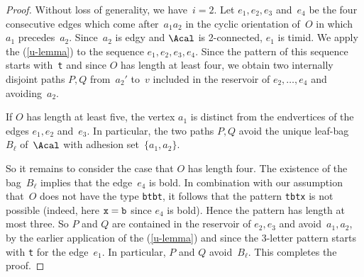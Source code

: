 \documentclass{aic}
\theoremstyle{plain}
\theoremstyle{definition}
\theoremstyle{plain}
\theoremstyle{plain}
\newcommand{\ty}[1]{{\tt#1}}
\begin{document}
\begin{proof}
Without loss of generality, we have~$i=2$.
Let $e_1,e_2,e_3$ and~$e_4$ be the four consecutive edges which come after~$a_1a_2$ in the 
cyclic orientation of~$O$ in which~$a_1$ precedes~$a_2$. 
Since~$a_2$ is edgy and $\Acal$ is 2-connected, $e_1$ is timid.
We apply the  (\ref{u-lemma}) to the sequence $e_1, e_2, e_3, e_4$. Since the pattern of this sequence starts with~\ty{t} and since $O$ has length at least four, we obtain two internally 
disjoint paths $P,Q$ from~$a_2'$ to~$v$ included in the reservoir of $e_2,\ldots ,e_4$ and avoiding~$a_2$.

If $O$ has length at least five, the vertex $a_1$ is distinct from the endvertices of the edges 
$e_1,e_2$ and~$e_3$. 
In particular, the two paths $P,Q$ avoid the unique leaf-bag~$B_\ell$ of~$\Acal$ with adhesion set~$\{a_1,a_2\}$.

So it remains to consider the case that $O$ has length four. 
The existence of the bag~$B_\ell$ implies that the 
edge~$e_4$ is bold. 
In combination with our assumption that~$O$ does not have the type \ty{btbt}, it follows that the pattern \ty{tbtx} is not possible (indeed, here $\ty{x}=\ty{b}$ since $e_4$ is bold).
Hence the pattern has length at most three.
So $P$ and $Q$ are contained in the reservoir of $e_2,e_3$ and avoid~$a_1,a_2$, by the earlier application of the  (\ref{u-lemma}) and since the 3-letter pattern starts with \ty{t} for the edge~$e_1$.
In particular, $P$ and $Q$ avoid~$B_\ell$.
This completes the proof.
\end{proof}
\end{document}
